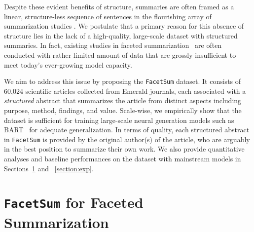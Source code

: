 \documentclass[11pt,a4paper]{article}
\newcommand{\ours}{\texttt{FacetSum}\xspace}
\begin{document}
Despite these evident benefits of structure, summaries are often framed as a linear, structure-less sequence of sentences in the flourishing array of summarization studies \citep{nallapati2017summarunner,see2017get,paulus2018a,grusky2018newsroom,narayan2018don,sharma2019bigpatent,lu2020multi,cachola2020tldr}.
We postulate that a primary reason for this absence of structure lies in the lack of a high-quality, large-scale dataset with structured summaries.
In fact, existing studies in faceted summarization~\cite{huang2020coda,tauchmann2018beyond,jaidka2016overview,contractor2012using,kim2011automatic,jaidka2018insights,stead2019emerald} are often conducted with rather limited amount of data
that are  grossly insufficient to meet today's ever-growing model capacity.

We aim to address this issue by proposing the \ours dataset.
It consists of 60,024 scientific articles collected from Emerald journals,
each associated with a \emph{structured} abstract that summarizes the  article from distinct aspects including purpose, method, findings, and value.
Scale-wise, we empirically show that the dataset is sufficient for training large-scale neural generation models such as BART~\cite{lewis2020bart} for adequate generalization. In terms of quality, each structured abstract in \ours is provided by the original author(s) of the article, who are arguably in the best position to summarize their own work.
We also provide quantitative analyses and baseline performances on the dataset with mainstream models in Sections~\ref{section:dataset} and 
~\ref{section:exp}.












\section{\ours for Faceted Summarization}
\label{section:dataset}
\end{document}
